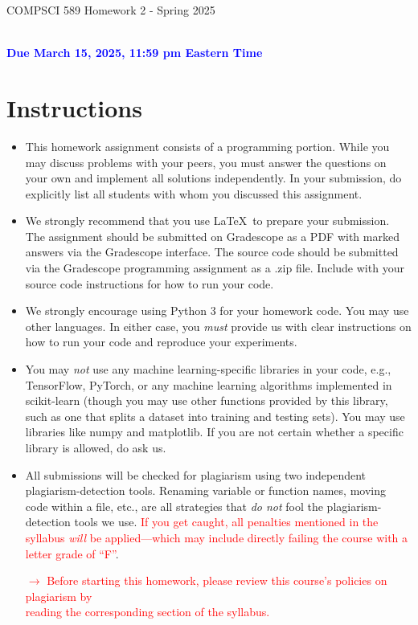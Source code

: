 \documentclass[letterpaper]{article}
\newcommand{\HIGHLIGHT}[1]{\textcolor{blue}{\textbf{#1}}}
\begin{document}
\newpage
\begin{center}
    \begin{Large}
    COMPSCI 589 Homework 2 - Spring 2025
    \end{Large}
    \\
    \HIGHLIGHT{Due March 15, 2025, 11:59 pm Eastern Time}
\end{center}



\vspace{0.25in}
\section{Instructions}

\begin{itemize}
    \item This homework assignment consists of a programming portion. While you may discuss problems with your peers, you must answer the questions on your own and implement all solutions independently. In your submission, do explicitly list all students with whom you discussed this assignment. 
    \item We strongly recommend that you use \LaTeX~to prepare your submission. The assignment should be submitted on Gradescope as a PDF with marked answers via the Gradescope interface. The source code should be submitted via the Gradescope programming assignment as a .zip file. Include with your source code instructions for how to run your code. 
    \item We strongly encourage using Python 3 for your homework code. You may use other languages. In either case, you \textit{must} provide us with clear instructions on how to run your code and reproduce your experiments. 
    \item You may \textit{not} use any machine learning-specific libraries in your code, e.g., TensorFlow, PyTorch, or any machine learning algorithms implemented in scikit-learn (though you may use other functions provided by this library, such as one that splits a dataset into training and testing sets). You may use libraries like numpy and matplotlib. If you are not certain whether a specific library is allowed, do ask us.
    \item All submissions will be checked for plagiarism using two independent plagiarism-detection tools. Renaming variable or function names, moving code within a file, etc., are all strategies that \textit{do not} fool the plagiarism-detection tools we use. \textcolor{red}{If you get caught, all penalties mentioned in the syllabus \textit{will} be applied---which may include directly failing the course with a letter grade of ``F''}.
    \begin{center}
        \textcolor{red}{$\rightarrow$ Before starting this homework, please review this course's policies on plagiarism by  \\reading the corresponding section of the syllabus.}
    \end{center}
    

\end{itemize}
\end{document}
